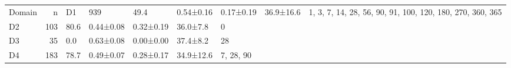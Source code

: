 \begin{tabular}{lrlllll}
\toprule
Domain & n & %
\midrule
D1 & 939 & 49.4 & 0.54±0.16 & 0.17±0.19 & 36.9±16.6 & 1, 3, 7, 14, 28, 56, 90, 91, 100, 120, 180, 270, 360, 365 \\
D2 & 103 & 80.6 & 0.44±0.08 & 0.32±0.19 & 36.0±7.8 & 0 \\
D3 & 35 & 0.0 & 0.63±0.08 & 0.00±0.00 & 37.4±8.2 & 28 \\
D4 & 183 & 78.7 & 0.49±0.07 & 0.28±0.17 & 34.9±12.6 & 7, 28, 90 \\
\bottomrule
\end{tabular}
